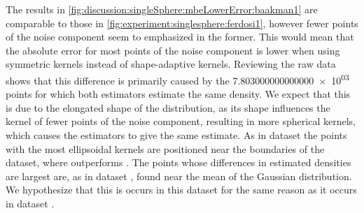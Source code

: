 		The results in \cref{fig:discussion:singleSphere:mbeLowerError:baakman1} are comparable to those in \cref{fig:experiment:singlesphere:ferdosi1}, however fewer points of the noise component seem to emphasized in the former. This would mean that the absolute error for most points of the noise component is lower when using symmetric kernels instead of shape-adaptive kernels. Reviewing the raw data shows that this difference is primarily caused by the \num{7.803000000000000e+03} points for which both estimators estimate the same density. We expect that this is due to the elongated shape of the distribution, as its shape influences the kernel of fewer points of the noise component, resulting in more spherical kernels, which causes the estimators to give the same estimate.
		As in dataset \ferdosiOne the points with the most ellipsoidal kernels are positioned near the boundaries of the dataset, where \sambe outperforms \mbe. 
		The points whose differences in estimated densities are largest are, as in dataset \ferdosiOne, found near the mean of the Gaussian distribution. We hypothesize that this is occurs in this dataset for the same reason as it occurs in dataset \ferdosiOne.






	
